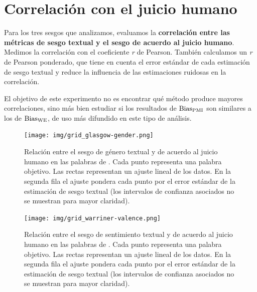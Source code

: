 

\section{Correlación con el juicio humano} \label{sec:experimento_correlacion}

Para los tres sesgos que analizamos, evaluamos la \textbf{correlación entre las métricas de sesgo textual y el sesgo de acuerdo al juicio humano}. Medimos la correlación con el coeficiente \emph{r} de Pearson. También calculamos un \emph{r} de Pearson ponderado, que tiene en cuenta el error estándar de cada estimación de sesgo textual y reduce la influencia de las estimaciones ruidosas en la correlación. 

El objetivo de este experimento no es encontrar qué método produce mayores correlaciones, sino más bien estudiar si los resultados de $\operatorname{Bias_{PMI}}$ son similares a los de $\operatorname{Bias_{WE}}$, de uso más difundido en este tipo de análisis. 



\begin{figure}[H]
    \centering
    \texttt{[image: img/grid\_glasgow-gender.png]}
    \caption{
        Relación entre el sesgo de género textual y de acuerdo al juicio humano en las palabras de \citet{lewis2020gender}. Cada punto representa una palabra objetivo. Las rectas representan un ajuste lineal de los datos. En la segunda fila el ajuste pondera cada punto por el error estándar de la estimación de sesgo textual (los intervalos de confianza asociados no se muestran para mayor claridad).
    }
    \label{fig:grid_corr_genero}
\end{figure}

\begin{figure}[H]
    \centering
    \texttt{[image: img/grid\_warriner-valence.png]}
    \caption{
        Relación entre el sesgo de sentimiento textual y de acuerdo al juicio humano en las palabras de \citet{toney2021valnorm}. Cada punto representa una palabra objetivo. Las rectas representan un ajuste lineal de los datos. En la segunda fila el ajuste pondera cada punto por el error estándar de la estimación de sesgo textual (los intervalos de confianza asociados no se muestran para mayor claridad).
    }
    \label{fig:grid_corr_sentimiento}
\end{figure}

